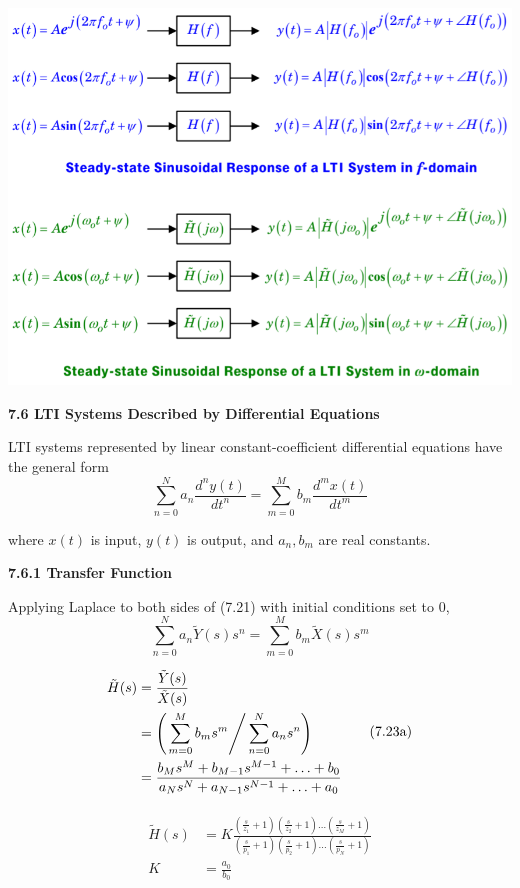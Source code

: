 \documentclass[landscape,a4paper]{extarticle}
\newenvironment{Figure}
  {\par\medskip\noindent\minipage{\linewidth}}
  {\endminipage\par\medskip}
\begin{document}
\begin{multicols*}{5}
    \begin{Figure}
        \includegraphics[width=\linewidth]{sinusoidalResponse.png}        
    \end{Figure}

    \textbf{7.6 LTI Systems Described by Differential Equations}

    LTI systems represented by linear constant-coefficient differential equations have the general form
    \[
        \sum_{n=0}^{N}a_n \frac{d^ny(t)}{dt^n} = \sum_{m=0}^{M} b_m \frac{d^mx(t)}{dt^m} \tag{7.21}
    \]

    where $x(t)$ is input, $y(t)$ is output, and $a_n, b_m$ are real constants.

    \textbf{7.6.1 Transfer Function}

    Applying Laplace to both sides of (7.21) with initial conditions set to 0,
    \[
        \sum_{n=0}^{N}a_n \tilde{Y}(s)s^n = \sum_{m=0}^{M} b_m \tilde{X}(s)s^m \tag{7.22}
    \]

    \begin{align*}
        \begin{split}
            \tilde{H}(s) &= \frac{\tilde{Y}(s)}{\tilde{X}(s)}\\
            &= \left( \left. \sum_{m=0}^{M}b_ms^m \right/ \sum_{n=0}^{N}a_ns^n \right) \\
            &= \frac{b_Ms^M + b_{M-1}s^{M-1} + \ldots + b_0}{a_Ns^N + a_{N-1}s^{N-1} + \ldots + a_0}
        \end{split} \tag{7.23a}
    \end{align*}

    \begin{align*}
        \begin{split}
            \tilde{H}(s) &= K\frac{\left(\frac{s}{z_1} + 1\right)\left(\frac{s}{z_2} + 1\right) \ldots \left(\frac{s}{z_M} + 1\right)}{\left(\frac{s}{p_1} + 1\right)\left(\frac{s}{p_2} + 1\right) \ldots \left(\frac{s}{p_N} + 1\right)}\\
            K &= \frac{a_0}{b_0}
        \end{split} \tag{7.23b}
    \end{align*}


\end{multicols*}
\end{document}

